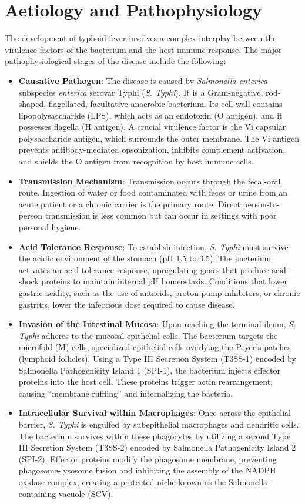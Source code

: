 \section*{Aetiology and Pathophysiology}
The development of typhoid fever involves a complex interplay between the virulence factors of the bacterium and the host immune response. The major pathophysiological stages of the disease include the following:
\begin{itemize}
  \item \textbf{Causative Pathogen}: The disease is caused by \textit{Salmonella enterica} subspecies \textit{enterica} serovar Typhi (\textit{S. Typhi}). It is a Gram-negative, rod-shaped, flagellated, facultative anaerobic bacterium. Its cell wall contains lipopolysaccharide (LPS), which acts as an endotoxin (O antigen), and it possesses flagella (H antigen). A crucial virulence factor is the Vi capsular polysaccharide antigen, which surrounds the outer membrane. The Vi antigen prevents antibody-mediated opsonization, inhibits complement activation, and shields the O antigen from recognition by host immune cells.
  \item \textbf{Transmission Mechanism}: Transmission occurs through the fecal-oral route. Ingestion of water or food contaminated with feces or urine from an acute patient or a chronic carrier is the primary route. Direct person-to-person transmission is less common but can occur in settings with poor personal hygiene.
  \item \textbf{Acid Tolerance Response}: To establish infection, \textit{S. Typhi} must survive the acidic environment of the stomach (pH 1.5 to 3.5). The bacterium activates an acid tolerance response, upregulating genes that produce acid-shock proteins to maintain internal pH homeostasis. Conditions that lower gastric acidity, such as the use of antacids, proton pump inhibitors, or chronic gastritis, lower the infectious dose required to cause disease.
  \item \textbf{Invasion of the Intestinal Mucosa}: Upon reaching the terminal ileum, \textit{S. Typhi} adheres to the mucosal epithelial cells. The bacterium targets the microfold (M) cells, specialized epithelial cells overlying the Peyer's patches (lymphoid follicles). Using a Type III Secretion System (T3SS-1) encoded by Salmonella Pathogenicity Island 1 (SPI-1), the bacterium injects effector proteins into the host cell. These proteins trigger actin rearrangement, causing ``membrane ruffling'' and internalizing the bacteria.
  \item \textbf{Intracellular Survival within Macrophages}: Once across the epithelial barrier, \textit{S. Typhi} is engulfed by subepithelial macrophages and dendritic cells. The bacterium survives within these phagocytes by utilizing a second Type III Secretion System (T3SS-2) encoded by Salmonella Pathogenicity Island 2 (SPI-2). Effector proteins modify the phagosome membrane, preventing phagosome-lysosome fusion and inhibiting the assembly of the NADPH oxidase complex, creating a protected niche known as the Salmonella-containing vacuole (SCV).

\end{itemize}
